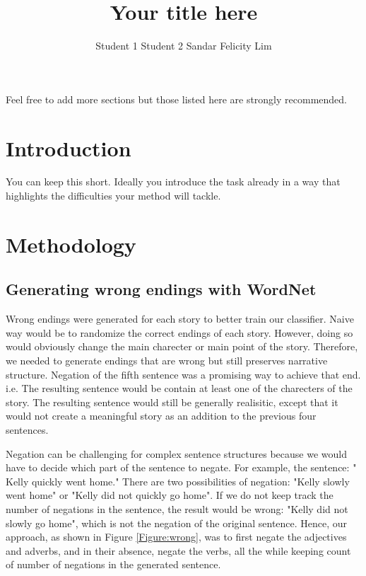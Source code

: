 \documentclass{article}
\title{Your title here}
\author{Student 1 \qquad Student 2 \qquad Sandar Felicity Lim}
\begin{document}

\maketitle


Feel free to add more sections but those listed here are strongly recommended.
\section{Introduction}
You can keep this short. Ideally you introduce the task already in a way that highlights the difficulties  your method will tackle.

\section{Methodology}
\subsection{Generating wrong endings with WordNet}
Wrong endings were generated for each story to better train our classifier. Naive way would be to randomize the correct endings of each story. However, doing so would obviously change the main charecter or main point of the story. Therefore, we needed to generate endings that are wrong but still preserves narrative structure. Negation of the fifth sentence was a promising way to achieve that end. i.e. The resulting sentence would be contain at least one of the charecters of the story. The resulting sentence would still be generally realisitic, except that it would not create a meaningful story as an addition to the previous four sentences.


Negation can be challenging for complex sentence structures because we would have to decide which part of the sentence to negate. For example, the sentence: "
Kelly quickly went home." There are two possibilities of negation: "Kelly slowly went home" or "Kelly did not quickly go home". If we do not keep track the number of negations in the sentence, the result would be wrong: "Kelly did not slowly go home", which is not the negation of the original sentence. Hence, our approach, as shown in  Figure \ref{Figure:wrong}, was to first negate the adjectives and adverbs, and in their absence, negate the verbs, all the while keeping count of number of negations in the generated sentence.
\end{document}
